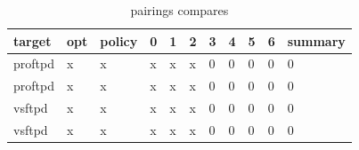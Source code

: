 \begin{table}[H]
\centering
\caption{matching}
\label{matching}
\end{table}

\begin{table}[H]
\centering
\caption{pairings compares}
\label{matching}
\begin{tabular}{|l|l|l|l|l|l|l|l|l|l|l|} \hline
\textbf{target}  & \textbf{opt}     & \textbf{policy} & \textbf{0}    &\textbf{1} & \textbf{2}  & \textbf{3} &\textbf{4} & \textbf{5} &\textbf{6}  &\textbf{summary} \\ \hline 
proftpd          &x                 &x                &x              &x          &x            &0           &0          &0           &0           &0     \\ \hline
proftpd          &x                 &x                &x              &x          &x            &0           &0          &0           &0           &0      \\ \hline
vsftpd           &x                 &x                &x              &x          &x            &0           &0          &0           &0           &0      \\ \hline
vsftpd           &x                 &x                &x              &x          &x            &0           &0          &0           &0           &0      \\ \hline

\end{tabular}
\end{table}

